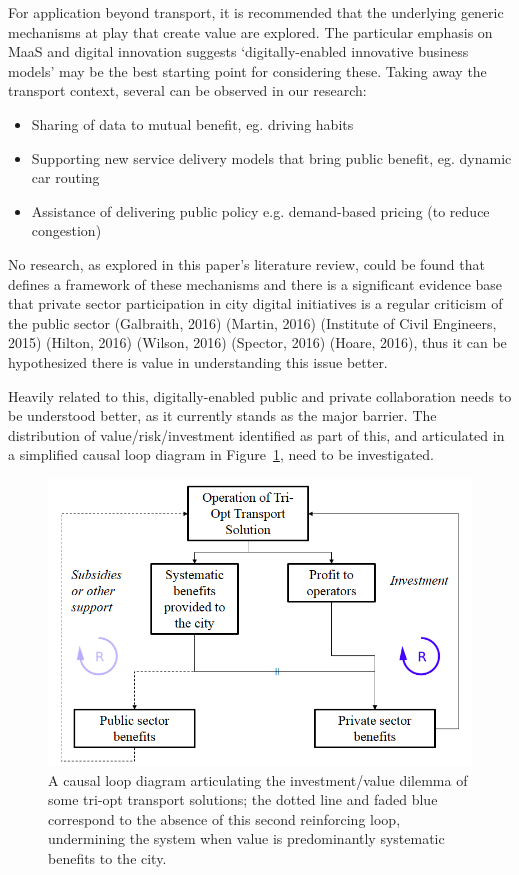 \documentclass[journal]{IEEEtran}
\begin{document}
For application beyond transport, it is recommended that the
underlying generic mechanisms at play that create value are
explored. The particular emphasis on MaaS and digital innovation
suggests `digitally-enabled innovative business models' may be the
best starting point for considering these. Taking away the transport
context, several can be observed in our research:

\begin{itemize}
\item Sharing of data to mutual benefit, eg. driving habits
\item Supporting new service delivery models that bring public
benefit, eg. dynamic car routing
\item Assistance of delivering public policy e.g. demand-based pricing
(to reduce congestion)
\end{itemize}

No research, as explored in this paper’s literature review, could be
found that defines a framework of these mechanisms and there is a
significant evidence base that private sector participation in city
digital initiatives is a regular criticism of the public sector
(Galbraith, 2016) (Martin, 2016) (Institute of Civil Engineers, 2015)
(Hilton, 2016) (Wilson, 2016) (Spector, 2016) (Hoare, 2016), thus it
can be hypothesized there is value in understanding this issue better.

Heavily related to this, digitally-enabled public and private
collaboration needs to be understood better, as it currently stands as
the major barrier. The distribution of value/risk/investment
identified as part of this, and articulated in a simplified causal
loop diagram in Figure~\ref{fig:causalloop}, need to be investigated.

\begin{figure}[!htb]
\centering
\includegraphics[width=\columnwidth]{images/causalloop.png}
\caption{A causal loop diagram articulating the investment/value
  dilemma of some tri-opt transport solutions; the dotted line and
  faded blue correspond to the absence of this second reinforcing
  loop, undermining the system when value is predominantly systematic
  benefits to the city.}
\label{fig:causalloop}
\end{figure}
\end{document}
